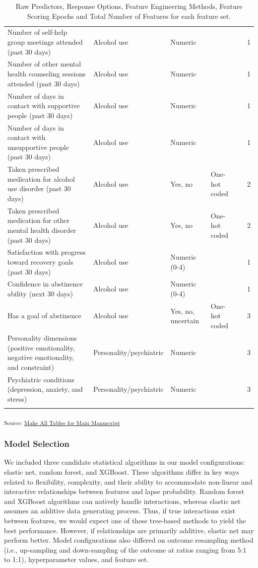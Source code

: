 \documentclass[
  letterpaper,
  DIV=11,
  numbers=noendperiod]{scrartcl}
\begin{document}
{\begin{longtable}[]{@{}lllllr@{}}
Number of self-help group meetings attended (past 30 days) & Alcohol use
& Numeric & & & 1 \\
Number of other mental health counseling sessions attended (past 30
days) & Alcohol use & Numeric & & & 1 \\
Number of days in contact with supportive people (past 30 days) &
Alcohol use & Numeric & & & 1 \\
Number of days in contact with unsupportive people (past 30 days) &
Alcohol use & Numeric & & & 1 \\
Taken prescribed medication for alcohol use disorder (past 30 days) &
Alcohol use & Yes, no & One-hot coded & & 2 \\
Taken prescribed medication for other mental health disorder (past 30
days) & Alcohol use & Yes, no & One-hot coded & & 2 \\
Satisfaction with progress toward recovery goals (past 30 days) &
Alcohol use & Numeric (0-4) & & & 1 \\
Confidence in abstinence ability (next 30 days) & Alcohol use & Numeric
(0-4) & & & 1 \\
Has a goal of abstinence & Alcohol use & Yes, no, uncertain & One-hot
coded & & 3 \\
Personality dimensions (positive emotionality, negative emotionality,
and constraint) & Personality/psychiatric & Numeric & & & 3 \\
Psychiatric conditions (depression, anxiety, and stress) &
Personality/psychiatric & Numeric & & & 3 \\


\caption{\label{tbl-1}Raw Predictors, Response Options, Feature
Engineering Methods, Feature Scoring Epochs and Total Number of Features
for each feature set.}

\tabularnewline
\end{longtable}

}

\textsubscript{Source:
\href{https://jjcurtin.github.io/study_messages/notebooks/mak_tables-preview.html\#cell-tbl-1}{Make
All Tables for Main Manuscript}}

\subsubsection{Model Selection}\label{model-selection}

We included three candidate statistical algorithms in our model
configurations: elastic net, random forest, and XGBoost. These
algorithms differ in key ways related to flexibility, complexity, and
their ability to accommodate non-linear and interactive relationships
between features and lapse probability. Random forest and XGBoost
algorithms can natively handle interactions, whereas elastic net assumes
an additive data generating process. Thus, if true interactions exist
between features, we would expect one of these tree-based methods to
yield the best performance. However, if relationships are primarily
additive, elastic net may perform better. Model configurations also
differed on outcome resampling method (i.e., up-sampling and
down-sampling of the outcome at ratios ranging from 5:1 to 1:1),
hyperparameter values, and feature set.
\end{document}
